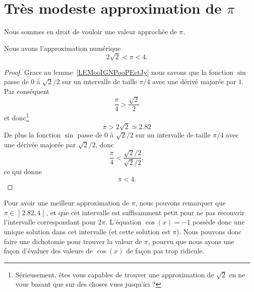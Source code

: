 
\section{Très modeste approximation de \texorpdfstring{$ \pi$}{pi}}

Nous sommes en droit de vouloir une valeur approchée de \( \pi\).
\begin{lemma}       \label{LEMooJWSGooExmtDA}
	Nous avons l'approximation numérique
	\begin{equation}
		2\sqrt{ 2 }<\pi<4.
	\end{equation}
\end{lemma}

\begin{proof}
	Grace au lemme~\ref{LEMooIGNPooPEctJy} nous savons que la fonction \( \sin\) passe de \( 0\) à \( \sqrt{ 2 }/2\) sur un intervalle de taille \( \pi/4\) avec une dérivé majorée par \( 1\). Par conséquent
	\begin{equation}
		\frac{ \pi }{ 4 }>\frac{ \sqrt{ 2 } }{2}
	\end{equation}
	et donc\footnote{Sérieusement, êtes vous capables de trouver une approximation de \( \sqrt{ 2 }\) en ne vous basant que sur des choses vues jusqu'ici ?}
	\begin{equation}
		\pi>2\sqrt{ 2 }\simeq 2.82
	\end{equation}
	De plus la fonction \( \sin\) passe de \( 0\) à \( \sqrt{ 2 }/2\) sur un intervalle de taille \( \pi/4\) avec une dérivée majorée par \( \sqrt{ 2 }/2\), donc
	\begin{equation}
		\frac{ \pi }{ 4 }<\frac{ \sqrt{ 2 }/2 }{ \sqrt{ 2 }/2 },
	\end{equation}
	ce qui donne
	\begin{equation}
		\pi<4.
	\end{equation}
\end{proof}

Pour avoir une meilleur approximation de \( \pi\), nous pouvons remarquer que \( \pi\in\mathopen] 2.82 , 4 \mathclose[\), et que cet intervalle est suffisamment petit pour ne pas recouvrir l'intervalle correspondant pour \( 2\pi\). L'équation \( \cos(x)=-1\) possède donc une unique solution dans cet intervalle (et cette solution est \( \pi\)). Nous pouvons donc faire une dichotomie pour trouver la valeur de \( \pi\), pourvu que nous ayons une façon d'évaluer des valeurs de \( \cos(x)\) de façon pas trop ridicule.

